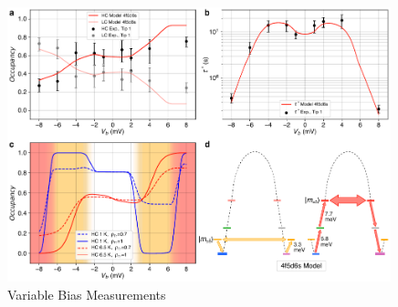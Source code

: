 \documentclass[
reprint,amsmath,amssymb,aps]{revtex4-2}
\begin{document}
\begin{figure}[ht!]
\includegraphics[width=0.99\textwidth]{Fig4_new.pdf}
\caption{Variable Bias Measurements
\label{fig:bias} }
\end{figure}



\end{document}
